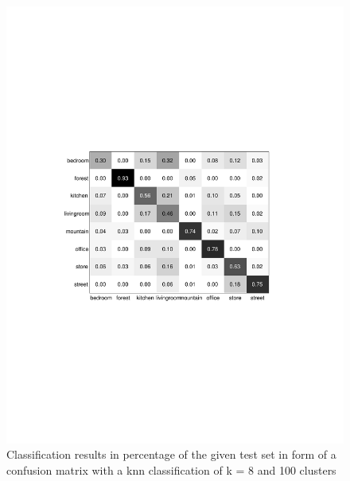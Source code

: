 \documentclass[subfigure,epsfig,fleqn,float,numbers=noenddot]{scrartcl}
\begin{document}
\begin{figure}
		\centering
		\includegraphics[width=\textwidth]{img/conf_matrix_k8_c100.pdf}
		\caption{Classification results in percentage of the given test set in form of a confusion matrix with a knn classification of k = 8 and 100 clusters}
		\label{fig:cluster100}
\end{figure}
\end{document}

